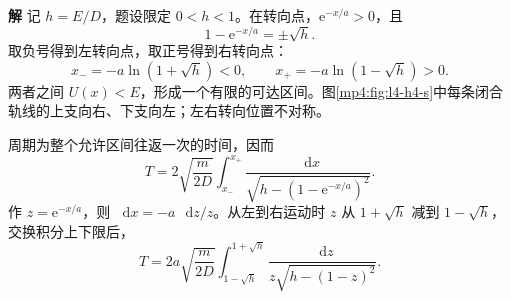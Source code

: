 \documentclass[11pt,openany,fontset=fandol]{ctexbook}
\theoremstyle{definition}\newtheorem{example}{例}[chapter]\newtheorem{exercise}{习题}[chapter]
\newcommand{\SolutionStart}{\par\medskip\ifdim\pagetotal>0pt\ifdim\dimexpr\pagegoal-\pagetotal\relax<3\baselineskip\newpage\fi\fi\noindent\textbf{解}\quad\ignorespaces}
\newenvironment{solution}{\SolutionStart}{\par\medskip}
\newcommand{\dd}{\mathop{}\!\mathrm d}\newcommand{\ee}{\mathrm e}\newcommand{\vct}[1]{\bm{#1}}
\begin{document}
\begin{solution}
记 $h=E/D$，题设限定 $0<h<1$。在转向点，$\ee^{-x/a}>0$，且
\[
1-\ee^{-x/a}=\pm\sqrt h.
\]
取负号得到左转向点，取正号得到右转向点：
\[
x_-=-a\ln(1+\sqrt h)<0,\qquad
x_+=-a\ln(1-\sqrt h)>0.
\]
两者之间 $U(x)<E$，形成一个有限的可达区间。图\ref{mp4:fig:l4-h4-s}中每条闭合轨线的上支向右、下支向左；左右转向位置不对称。

周期为整个允许区间往返一次的时间，因而
\[
T=2\sqrt{\frac m{2D}}\int_{x_-}^{x_+}
\frac{\dd x}{\sqrt{h-(1-\ee^{-x/a})^2}}.
\]
作 $z=\ee^{-x/a}$，则 $\dd x=-a\,\dd z/z$。从左到右运动时 $z$ 从 $1+\sqrt h$ 减到 $1-\sqrt h$，交换积分上下限后，
\[
T=2a\sqrt{\frac m{2D}}\int_{1-\sqrt h}^{1+\sqrt h}
\frac{\dd z}{z\sqrt{h-(1-z)^2}}.
\]

\begin{figure}[H]\centering
{}
\end{figure}
\end{solution}
\end{document}
